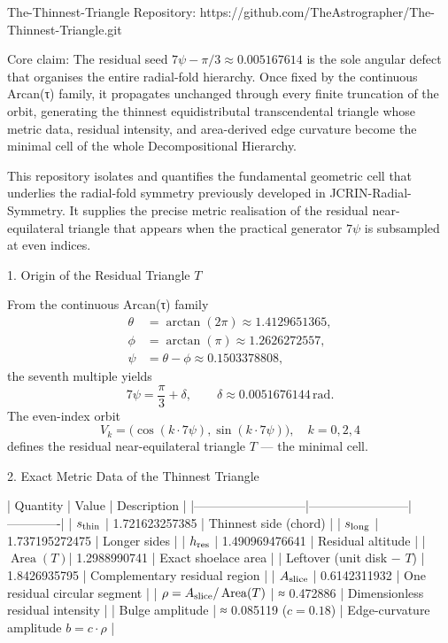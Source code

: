 The-Thinnest-Triangle  
Repository: https://github.com/TheAstrographer/The-Thinnest-Triangle.git  

Core claim:  
The residual seed \(7\psi - \pi/3 \approx 0.005167614\) is the sole angular defect that organises the entire radial-fold hierarchy. Once fixed by the continuous Arcan(τ) family, it propagates unchanged through every finite truncation of the orbit, generating the thinnest equidistributal transcendental triangle whose metric data, residual intensity, and area-derived edge curvature become the minimal cell of the whole Decompositional Hierarchy.

This repository isolates and quantifies the fundamental geometric cell that underlies the radial-fold symmetry previously developed in JCRIN-Radial-Symmetry. It supplies the precise metric realisation of the residual near-equilateral triangle that appears when the practical generator \(7\psi\) is subsampled at even indices.

1. Origin of the Residual Triangle \(T\)

From the continuous Arcan(τ) family
\[
\begin{align*}
\theta &= \arctan(2\pi) \approx 1.4129651365,\\
\phi &= \arctan(\pi) \approx 1.2626272557,\\
\psi &= \theta - \phi \approx 0.1503378808,
\end{align*}
\]
the seventh multiple yields
\[
7\psi = \frac{\pi}{3} + \delta, \qquad \delta \approx 0.0051676144\,\mathrm{rad}.
\]
The even-index orbit
\[
V_k = \bigl(\cos(k\cdot 7\psi),\sin(k\cdot 7\psi)\bigr), \quad k=0,2,4
\]
defines the residual near-equilateral triangle \(T\) — the minimal cell.

2. Exact Metric Data of the Thinnest Triangle

| Quantity                  | Value                  | Description |
|---------------------------|------------------------|-------------|
| \(s_{\rm thin}\)          | 1.721623257385        | Thinnest side (chord) |
| \(s_{\rm long}\)          | 1.737195272475        | Longer sides |
| \(h_{\rm res}\)           | 1.490969476641        | Residual altitude |
| \(\operatorname{Area}(T)\)| 1.2988990741          | Exact shoelace area |
| Leftover (unit disk − \(T\)) | 1.8426935795       | Complementary residual region |
| \(A_{\rm slice}\)         | 0.6142311932          | One residual circular segment |
| \(\rho = A_{\rm slice}/\operatorname{Area}(T)\) | ≈ 0.472886 | Dimensionless residual intensity |
| Bulge amplitude           | ≈ 0.085119 (\(c=0.18\)) | Edge-curvature amplitude \(b = c\cdot\rho\) |

